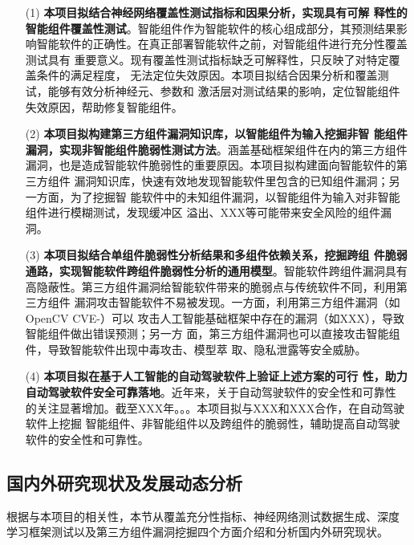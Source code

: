 \begin{itemize}
    \item[(1)]\textbf{本项目拟结合神经网络覆盖性测试指标和因果分析，实现具有可解
    释性的智能组件覆盖性测试}。智能组件作为智能软件的核心组成部分，其预测结果影
    响智能软件的正确性。在真正部署智能软件之前，对智能组件进行充分性覆盖测试具有
    重要意义。现有覆盖性测试指标缺乏可解释性，只反映了对特定覆盖条件的满足程度，
    无法定位失效原因。本项目拟结合因果分析和覆盖测试，能够有效分析神经元、参数和
    激活层对测试结果的影响，定位智能组件失效原因，帮助修复智能组件。
    \item[(2)]\textbf{本项目拟构建第三方组件漏洞知识库，以智能组件为输入挖掘非智
    能组件漏洞，实现非智能组件脆弱性测试方法}。涵盖基础框架组件在内的第三方组件
    漏洞，也是造成智能软件脆弱性的重要原因。本项目拟构建面向智能软件的第三方组件
    漏洞知识库，快速有效地发现智能软件里包含的已知组件漏洞；另一方面，为了挖掘智
    能软件中的未知组件漏洞，以智能组件为输入对非智能组件进行模糊测试，发现缓冲区
    溢出、XXX等可能带来安全风险的组件漏洞。
    \item[(3)]\textbf{本项目拟结合单组件脆弱性分析结果和多组件依赖关系，挖掘跨组
    件脆弱通路，实现智能软件跨组件脆弱性分析的通用模型}。智能软件跨组件漏洞具有
    高隐蔽性。第三方组件漏洞给智能软件带来的脆弱点与传统软件不同，利用第三方组件
    漏洞攻击智能软件不易被发现。一方面，利用第三方组件漏洞（如OpenCV CVE-）可以
    攻击人工智能基础框架中存在的漏洞（如XXX），导致智能组件做出错误预测；另一方
    面，第三方组件漏洞也可以直接攻击智能组件，导致智能软件出现中毒攻击、模型萃
    取、隐私泄露等安全威胁。
    \item[(4)]\textbf{本项目拟在基于人工智能的自动驾驶软件上验证上述方案的可行
    性，助力自动驾驶软件安全可靠落地}。近年来，关于自动驾驶软件的安全性和可靠性
    的关注显著增加。截至XXX年。。。本项目拟与XXX和XXX合作，在自动驾驶软件上挖掘
    智能组件、非智能组件以及跨组件的脆弱性，辅助提高自动驾驶软件的安全性和可靠性。
\end{itemize}




\subsection{国内外研究现状及发展动态分析}\label{relatedwork}

根据与本项目的相关性，本节从覆盖充分性指标、神经网络测试数据生成、深度
学习框架测试以及第三方组件漏洞挖掘四个方面介绍和分析国内外研究现状。


